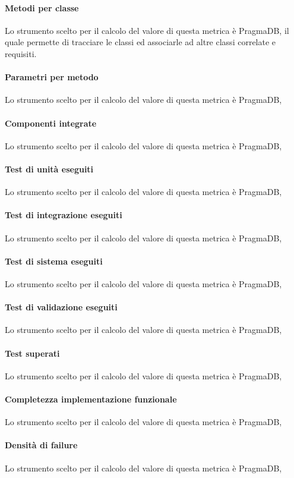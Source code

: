 \paragraph{Metodi per classe}
Lo strumento scelto per il calcolo del valore di questa metrica è PragmaDB, il quale permette di tracciare le classi ed associarle ad altre classi correlate e requisiti.
\paragraph{Parametri per metodo}
Lo strumento scelto per il calcolo del valore di questa metrica è PragmaDB,
\paragraph{Componenti integrate}
Lo strumento scelto per il calcolo del valore di questa metrica è PragmaDB,
\paragraph{Test di unità eseguiti}
Lo strumento scelto per il calcolo del valore di questa metrica è PragmaDB,
\paragraph{Test di integrazione eseguiti}
Lo strumento scelto per il calcolo del valore di questa metrica è PragmaDB,
\paragraph{Test di sistema eseguiti}
Lo strumento scelto per il calcolo del valore di questa metrica è PragmaDB,
\paragraph{Test di validazione eseguiti}
Lo strumento scelto per il calcolo del valore di questa metrica è PragmaDB,
\paragraph{Test superati}
Lo strumento scelto per il calcolo del valore di questa metrica è PragmaDB,
\paragraph{Completezza implementazione funzionale}
Lo strumento scelto per il calcolo del valore di questa metrica è PragmaDB,
\paragraph{Densità di failure}
Lo strumento scelto per il calcolo del valore di questa metrica è PragmaDB,